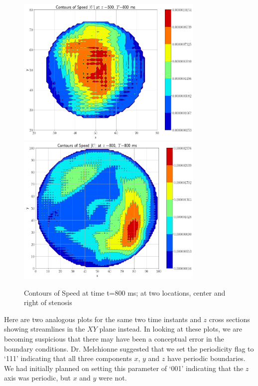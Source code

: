 \documentclass[11pt]{article} %
\begin{document}
\begin{figure}[h!]
\centering
\hspace*{-0.25in}
\includegraphics[width=0.8\textwidth]{contour_speed/contour_speed_z_500_t_800.png}
\includegraphics[width=0.8\textwidth]{contour_speed/contour_speed_z_800_t_800.png}
\caption{Contours of Speed at time t=800 ms; at two locations, center and right of stenosis}
\end{figure}

Here are two analogous plots for the same two time instants and $z$ cross sections showing
streamlines in the $XY$ plane instead.
In looking at these plots, we are becoming suspicious that there may have been a 
conceptual error in the boundary conditions.  
Dr. Melchionne suggested that we set the periodicity flag to `111' indicating that all three
components $x$, $y$ and $z$ have periodic boundaries.
We had initially planned on setting this parameter of `001' indicating that the $z$ axis
was periodic, but $x$ and $y$ were not.
\end{document}
